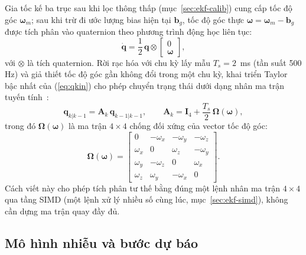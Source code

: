 Gia tốc kế ba trục sau khi lọc thông thấp (mục~\ref{sec:ekf-calib}) cung cấp tốc độ góc $\boldsymbol\omega_m$; sau khi trừ đi ước lượng bias hiện tại $\mathbf{b}_g$, tốc độ góc thực $\boldsymbol\omega = \boldsymbol\omega_m - \mathbf{b}_g$ được tích phân vào quaternion theo phương trình động học liên tục:
\begin{equation}
\dot{\mathbf{q}} = \frac{1}{2}\, \mathbf{q} \otimes \begin{bmatrix} 0 \\ \boldsymbol\omega \end{bmatrix},
\label{eq:qkin}
\end{equation}
với $\otimes$ là tích quaternion. Rời rạc hóa với chu kỳ lấy mẫu $T_s = 2$~ms (tần suất 500 Hz) và giả thiết tốc độ góc gần không đổi trong một chu kỳ, khai triển Taylor bậc nhất của (\ref{eq:qkin}) cho phép chuyển trạng thái dưới dạng nhân ma trận tuyến tính~\cite{ahrs-ekf}:
\begin{equation}
\mathbf{q}_{k|k-1} = \mathbf{A}_k\, \mathbf{q}_{k-1|k-1}, \qquad
\mathbf{A}_k = \mathbf{I}_4 + \dfrac{T_s}{2}\, \boldsymbol\Omega(\boldsymbol\omega),
\label{eq:qupdate}
\end{equation}
trong đó $\boldsymbol\Omega(\boldsymbol\omega)$ là ma trận $4\times 4$ chống đối xứng của vector tốc độ góc:
\begin{equation}
\boldsymbol\Omega(\boldsymbol\omega) =
\begin{bmatrix}
0 & -\omega_x & -\omega_y & -\omega_z \\
\omega_x & 0 & \omega_z & -\omega_y \\
\omega_y & -\omega_z & 0 & \omega_x \\
\omega_z & \omega_y & -\omega_x & 0
\end{bmatrix}.
\end{equation}
Cách viết này cho phép tích phân tư thế bằng đúng một lệnh nhân ma trận $4\times 4$ qua tầng SIMD (một lệnh xử lý nhiều số cùng lúc, mục~\ref{sec:ekf-simd}), không cần dựng ma trận quay đầy đủ.

\subsection{Mô hình nhiễu và bước dự báo}

